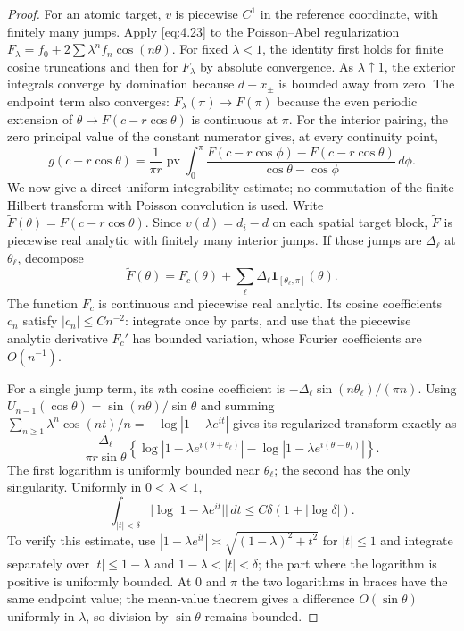 \documentclass[11pt]{article}
\numberwithin{equation}{section}
\theoremstyle{plain}
\theoremstyle{definition}
\theoremstyle{remark}
\newcommand{\1}{\mathbf 1}
\newcommand{\dd}{\,d}
\newcommand{\pv}{\operatorname {pv}}
\begin{document}
\begin{proof}
For an atomic target, $v$ is piecewise $C^1$ in the reference coordinate,
with finitely many jumps.  Apply \eqref{eq:4.23} to the Poisson--Abel regularization
$F_\lambda=f_0+2\sum\lambda^nf_n\cos(n\theta)$.  For fixed
$\lambda<1$, the identity first holds for finite cosine truncations and
then for $F_\lambda$ by absolute convergence.  As $\lambda\uparrow1$, the
exterior integrals converge by domination because $d-x_\pm$ is bounded
away from zero.  The endpoint term also converges:
$F_\lambda(\pi)\to F(\pi)$ because the even periodic extension of
$\theta\mapsto F(c-r\cos\theta)$ is continuous at $\pi$.
For the interior pairing, the
zero principal value of the constant numerator gives, at every continuity
point,
\[
 g(c-r\cos\theta)=\frac1{\pi r}\pv\int_0^\pi
 \frac{F(c-r\cos\phi)-F(c-r\cos\theta)}
      {\cos\theta-\cos\phi}\dd\phi.
\]
We now give a direct uniform-integrability estimate; no commutation of the
finite Hilbert transform with Poisson convolution is used.  Write
$\widetilde F(\theta)=F(c-r\cos\theta)$.  Since
$v(d)=d_i-d$ on each spatial target block, $\widetilde F$ is piecewise
real analytic with finitely many interior jumps.  If those jumps are
$\Delta_\ell$ at $\theta_\ell$, decompose
\[
 \widetilde F(\theta)=F_c(\theta)+
   \sum_\ell\Delta_\ell\1_{[\theta_\ell,\pi]}(\theta).
\]
The function $F_c$ is continuous and piecewise real analytic.  Its cosine
coefficients $c_n$ satisfy $|c_n|\le Cn^{-2}$: integrate once by parts,
and use that the piecewise analytic derivative $F_c'$ has bounded variation,
whose Fourier coefficients are $O(n^{-1})$.

For a single jump term, its $n$th cosine coefficient is
$-\Delta_\ell\sin(n\theta_\ell)/(\pi n)$.  Using
$U_{n-1}(\cos\theta)=\sin(n\theta)/\sin\theta$ and summing
$\sum_{n\ge1}\lambda^n\cos(nt)/n=-\log|1-\lambda e^{it}|$ gives its
regularized transform exactly as
\[
 \frac{\Delta_\ell}{\pi r\sin\theta}
 \left\{\log|1-\lambda e^{i(\theta+\theta_\ell)}|
       -\log|1-\lambda e^{i(\theta-\theta_\ell)}|\right\}.
\]
The first logarithm is uniformly bounded near $\theta_\ell$; the second
has the only singularity.  Uniformly in $0<\lambda<1$,
\[
 \int_{|t|<\delta}|\log|1-\lambda e^{it}||\dd t
 \le C\delta(1+|\log\delta|).
\]
To verify this estimate, use
$|1-\lambda e^{it}|\asymp\sqrt{(1-\lambda)^2+t^2}$ for $|t|\le1$ and
integrate separately over $|t|\le1-\lambda$ and
$1-\lambda<|t|<\delta$; the part where the logarithm is positive is
uniformly bounded.  At $0$ and $\pi$ the two logarithms in braces have the
same endpoint value; the mean-value theorem gives a difference
$O(\sin\theta)$ uniformly in $\lambda$, so division by $\sin\theta$
remains bounded.


\end{proof}
\end{document}
